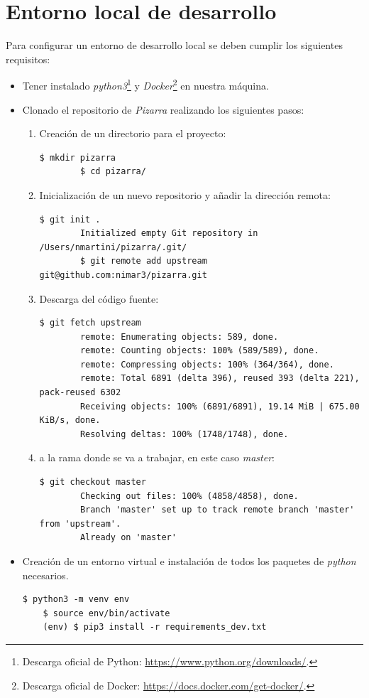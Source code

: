 \documentclass[11pt,spanish,listoffigures,listoftables]{tfgetsinf}
\begin{document}
\section{Entorno local de desarrollo}

Para configurar un entorno de desarrollo local se deben cumplir los siguientes requisitos:
\begin{itemize}
    \item  Tener instalado \textit{python3}\footnote{Descarga oficial de Python: \url{https://www.python.org/downloads/}.} y \textit{Docker}\footnote{Descarga oficial de Docker: \url{https://docs.docker.com/get-docker/}.} en nuestra máquina.
	\item Clonado el repositorio de \textit{Pizarra} realizando los siguientes pasos:
	\begin{enumerate}
		\item Creación de un directorio para el proyecto:
		\begin{lstlisting}[style=ascii-tree]
		$ mkdir pizarra
		$ cd pizarra/
		\end{lstlisting}
		\item Inicialización de un nuevo repositorio y añadir la dirección remota:
		\begin{lstlisting}[style=ascii-tree]
		$ git init .
		Initialized empty Git repository in /Users/nmartini/pizarra/.git/
		$ git remote add upstream git@github.com:nimar3/pizarra.git
		\end{lstlisting}
		\item Descarga del código fuente:
		\begin{lstlisting}[style=ascii-tree]
		$ git fetch upstream
		remote: Enumerating objects: 589, done.
		remote: Counting objects: 100% (589/589), done.
		remote: Compressing objects: 100% (364/364), done.
		remote: Total 6891 (delta 396), reused 393 (delta 221), pack-reused 6302
		Receiving objects: 100% (6891/6891), 19.14 MiB | 675.00 KiB/s, done.
		Resolving deltas: 100% (1748/1748), done.
		\end{lstlisting}
		\item {} a la rama donde se va a trabajar, en este caso \textit{master}:
		\begin{lstlisting}[style=ascii-tree]
		$ git checkout master
		Checking out files: 100% (4858/4858), done.
		Branch 'master' set up to track remote branch 'master' from 'upstream'.
		Already on 'master'
		\end{lstlisting}
	\end{enumerate}
	\item Creación de un entorno virtual e instalación de todos los \Gls{paquete}s de \textit{python} necesarios.
	\begin{lstlisting}[style=ascii-tree]
	$ python3 -m venv env
	$ source env/bin/activate   
	(env) $ pip3 install -r requirements_dev.txt
	\end{lstlisting}
\end{itemize}
\end{document}
